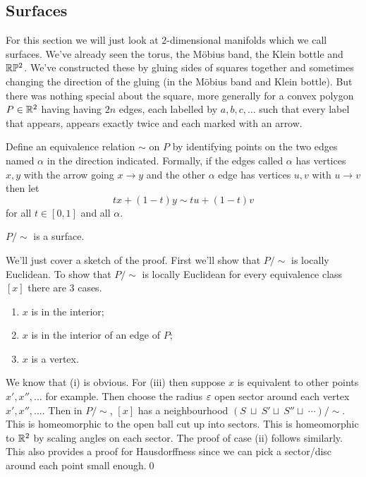 \documentclass{article}
\begin{document}
\subsection{Surfaces}
For this section we will just look at $ 2 $-dimensional manifolds which we call surfaces. We've already seen the torus, the M\"obius band, the Klein bottle and $ \mathbb{R}\mathbb P^2 $. We've constructed these by gluing sides of squares together and sometimes changing the direction of the gluing (in the M\"obius band and Klein bottle). But there was nothing special about the square, more generally for a convex polygon $ P\in \mathbb{R}^2 $ having having $ 2n $ edges, each labelled by $ a,b,c,\dots $ such that every label that appears, appears exactly twice and each marked with an arrow.\par
Define an equivalence relation $ \sim $ on $ P $ by identifying points on the two edges named $ \alpha $ in the direction indicated. Formally, if the edges called $ \alpha $ has vertices $ x,y $ with the arrow going $ x\to y $ and the other $ \alpha $ edge has vertices $ u,v $ with $ u\to v $ then let
\[
  tx+(1-t)y \sim tu+(1-t)v
\]
for all $ t\in [0,1] $ and all $ \alpha $.
\begin{theorem}
  $ P/\sim $ is a surface.
\end{theorem}
\pf We'll just cover a sketch of the proof. First we'll show that $ P/\sim $ is locally Euclidean. To show that $ P/\sim $ is locally Euclidean for every equivalence class $ [x] $ there are 3 cases.
\begin{enumerate}
	\item $ x $ is in the interior;
	\item $ x $ is in the interior of an edge of $ P $;
	\item $ x $ is a vertex.
\end{enumerate}
We know that (i) is obvious. For (iii) then suppose $ x $ is equivalent to other points $ x', x'', \dots $ for example. Then choose the radius $ \varepsilon $ open sector around each vertex $ x',x'',\dots $. Then in $ P/\sim $, $ [x] $ has a neighbourhood $ (S \ \sqcup \ S'\sqcup \ S''\sqcup \ \cdots )/\sim $. This is homeomorphic to the open ball cut up into sectors. This is homeomorphic to $ \mathbb{R}^2 $ by scaling angles on each sector. The proof of case (ii) follows similarly. This also provides a proof for Hausdorffness since we can pick a sector/disc around each point small enough.\qed 
\end{document}

